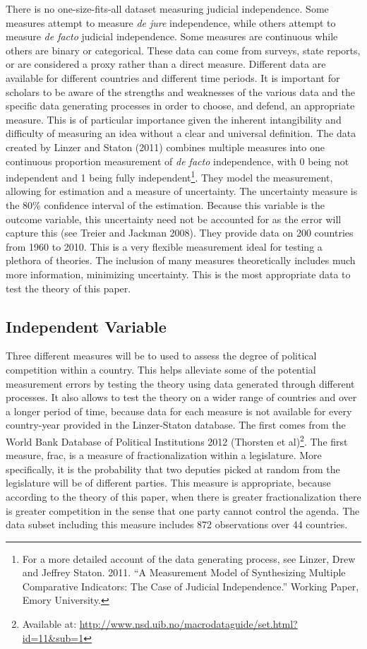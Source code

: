 \documentclass[12pt]{article}
\begin{document}
There is no one-size-fits-all dataset measuring judicial independence. Some measures attempt to measure \textit{de jure} independence, while others attempt to measure \textit{de facto} judicial independence. Some measures are continuous while others are binary or categorical. These data can come from surveys, state reports, or are considered a proxy rather than a direct measure. Different data are available for different countries and different time periods. It is important for scholars to be aware of the strengths and weaknesses of the various data and the specific data generating processes in order to choose, and defend, an appropriate measure. This is of particular importance given the inherent intangibility and difficulty of measuring an idea without a clear and universal definition. The data created by Linzer and Staton (2011) combines multiple measures into one continuous proportion measurement of \textit{de facto} independence, with 0 being not independent and 1 being fully independent\footnote{For a more detailed account of the data generating process, see Linzer, Drew and Jeffrey Staton. 2011. ``A Measurement Model of Synthesizing Multiple Comparative Indicators: The Case of Judicial Independence.'' Working Paper, Emory University.}. They model the measurement, allowing for estimation and a measure of uncertainty. The uncertainty measure is the 80\% confidence interval of the estimation. Because this variable is the outcome variable, this uncertainty need not be accounted for as the error will capture this (see Treier and Jackman 2008). They provide data on 200 countries from 1960 to 2010. This is a very flexible measurement ideal for testing a plethora of theories. The inclusion of many measures theoretically includes much more information, minimizing uncertainty. This is the most appropriate data to test the theory of this paper.

\subsection*{Independent Variable}
Three different measures will be to used to assess the degree of political competition within a country. This helps alleviate some of the potential measurement errors by testing the theory using data generated through different processes. It also allows to test the theory on a wider range of countries and over a longer period of time, because data for each measure is not available for every country-year provided in the Linzer-Staton database. The first comes from the World Bank Database of Political Institutions 2012 (Thorsten et al)\footnote{Available at: \url{http://www.nsd.uib.no/macrodataguide/set.html?id=11&sub=1}}. The first measure, frac, is a measure of fractionalization within a legislature. More specifically, it is the probability that two deputies picked at random from the legislature will be of different parties. This measure is appropriate, because according to the theory of this paper, when there is greater fractionalization there is greater competition in the sense that one party cannot control the agenda. The data subset including this measure includes 872 observations over 44 countries.
\end{document}
